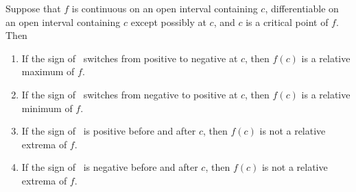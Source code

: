 %
{Suppose that $f$ is continuous on an open interval containing $c$, differentiable on an open interval containing $c$ except possibly at $c$, and $c$ is a critical point of $f$. Then
\begin{enumerate}
\item	If the sign of \fp\ switches from positive to negative at $c$, then $f(c)$ is a relative maximum of $f$.
\item	If the sign of \fp\ switches from negative to positive at $c$, then $f(c)$ is a relative minimum of $f$.
\item	If the sign of \fp\ is positive before and after $c$, then $f(c)$ is not a relative extrema of $f$.
\item	If the sign of \fp\ is negative before and after $c$, then $f(c)$ is not a relative extrema of $f$.
\end{enumerate}}


